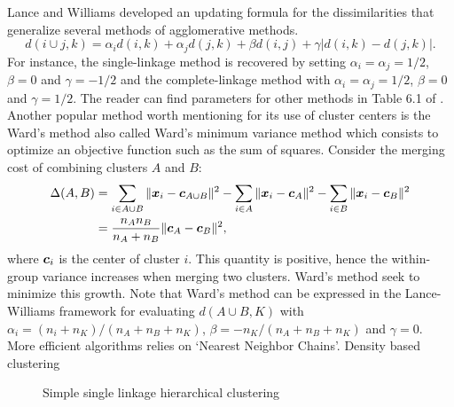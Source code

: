 Lance and Williams developed an updating formula \citep{lance_williams_67} for the dissimilarities that generalize several methods of agglomerative methods. 
\begin{equation}
  d(i \cup j,k) = \alpha_id(i,k)+\alpha_jd(j,k)+\beta d(i, j) +\gamma |d(i,k)-d(j,k)|.
\end{equation}
For instance, the single-linkage method is recovered by setting $\alpha_i =\alpha_j = 1/2$, $\beta =0$ and $\gamma =-1/2$ and the complete-linkage method with $\alpha_i =\alpha_j = 1/2$, $\beta =0$ and $\gamma =1/2$. The reader can find parameters for other methods in Table 6.1 of \citep{hennig2015handbook}.
Another popular method worth mentioning for its use of cluster centers is the Ward's method\citep{ward63} also called Ward's minimum variance method which consists to optimize an objective function such as the sum of squares. Consider the merging cost of combining clusters $A$ and $B$:
\begin{align*}
  \Delta(A,B) &= \sum_{i\in A\cup B} \|\boldsymbol x_i - \boldsymbol c_{A \cup B} \|^2-\sum_{i\in A} \|\boldsymbol x_i - \boldsymbol c_{A} \|^2-\sum_{i\in B} \|\boldsymbol x_i - \boldsymbol c_{B} \|^2\\
  &= \frac{n_An_B}{n_A+ n_B}\|\boldsymbol c_A - \boldsymbol c_B \|^2,
\end{align*}
where $\boldsymbol c_i$ is the center of cluster $i$.  This quantity is positive, hence the within-group variance increases when merging two clusters. Ward's method seek to minimize this growth. Note that Ward's method can be expressed in the Lance-Williams framework for evaluating $d(A \cup B, K)$ with $\alpha_i=(n_i+n_K)/(n_A+n_B+n_K)$, $\beta=-n_K/(n_A+n_B+n_K)$ and $\gamma=0$. More efficient algorithms relies on `Nearest Neighbor Chains'. Density based clustering

\begin{figure}[h]
\begin{center}
   \caption{Simple single linkage hierarchical clustering}
   \label{algo:single_linkage_hier_algo}
\end{center}
\vspace{-15pt}
\end{figure}


